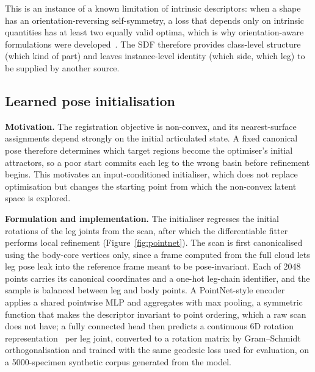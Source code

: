 This is an instance of a known limitation of intrinsic descriptors: when a shape
has an orientation-reversing self-symmetry, a loss that depends only on intrinsic
quantities has at least two equally valid optima, which is why orientation-aware
formulations were developed~\cite{donati}. The SDF therefore provides class-level
structure (which kind of part) and leaves instance-level identity (which side,
which leg) to be supplied by another source.

\subsection{Learned pose initialisation}
\label{sec:pointnet}

\textbf{Motivation.} The registration objective is non-convex, and its
nearest-surface assignments depend strongly on the initial articulated state. A
fixed canonical pose therefore determines which target regions become the
optimiser's initial attractors, so a poor start commits each leg to the wrong
basin before refinement begins. This motivates an input-conditioned initialiser,
which does not replace optimisation but changes the starting point from which the
non-convex latent space is explored.

\textbf{Formulation and implementation.} The initialiser regresses the initial
rotations of the leg joints from the scan, after which the differentiable fitter
performs local refinement (Figure~\ref{fig:pointnet}). The scan is first
canonicalised using the body-core vertices only, since a frame computed from the
full cloud lets leg pose leak into the reference frame meant to be
pose-invariant. Each of 2048 points carries its canonical coordinates and a
one-hot leg-chain identifier, and the sample is balanced between leg and body
points. A PointNet-style encoder~\cite{pointnet} applies a shared pointwise MLP
and aggregates with max pooling, a symmetric function that makes the descriptor
invariant to point ordering, which a raw scan does not have; a fully connected head
then predicts a continuous 6D rotation representation~\cite{zhou6d} per leg joint,
converted to a rotation matrix by Gram--Schmidt orthogonalisation and trained with
the same geodesic loss used for evaluation, on a 5000-specimen synthetic corpus
generated from the model.

